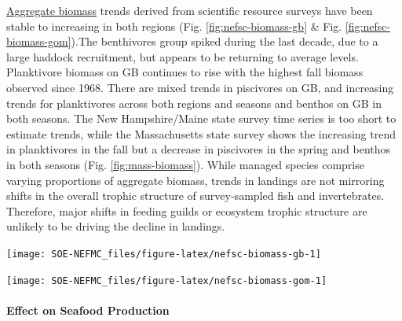 \documentclass[
  10pt,
]{article}
\let\origfigure\figure
\let\endorigfigure\endfigure
\renewenvironment{figure}[1][2] {
    \expandafter\origfigure\expandafter[H]
} {
    \endorigfigure
}
\begin{document}
\href{https://noaa-edab.github.io/catalog/aggregate_biomass.html}{Aggregate biomass} trends derived from scientific resource surveys have been stable to increasing in both regions (Fig. \ref{fig:nefsc-biomass-gb} \& Fig. \ref{fig:nefsc-biomass-gom}).The benthivores group spiked during the last decade, due to a large haddock recruitment, but appears to be returning to average levels. Planktivore biomass on GB continues to rise with the highest fall biomass observed since 1968. There are mixed trends in piscivores on GB, and increasing trends for planktivores across both regions and seasons and benthos on GB in both seasons. The New Hampshire/Maine state survey time series is too short to estimate trends, while the Massachusetts state survey shows the increasing trend in planktivores in the fall but a decrease in piscivores in the spring and benthos in both seasons (Fig. \ref{fig:mass-biomass}). While managed species comprise varying proportions of aggregate biomass, trends in landings are not mirroring shifts in the overall trophic structure of survey-sampled fish and invertebrates. Therefore, major shifts in feeding guilds or ecosystem trophic structure are unlikely to be driving the decline in landings.

\begin{figure}

{\centering \texttt{[image: SOE-NEFMC\_files/figure-latex/nefsc-biomass-gb-1]} 

}

\caption{Spring (left) and fall (right) surveyed biomass on Georges Bank. The shaded area around each annual mean represents 2 standard deviations from the mean.}\label{fig:nefsc-biomass-gb}
\end{figure}

\begin{figure}

{\centering \texttt{[image: SOE-NEFMC\_files/figure-latex/nefsc-biomass-gom-1]} 

}

\caption{Spring (left) and fall (right) surveyed biomass in the Gulf of Maine. The shaded area around each annual mean represents 2 standard deviations from the mean.}\label{fig:nefsc-biomass-gom}
\end{figure}

\hypertarget{effect-on-seafood-production}{%
\paragraph{Effect on Seafood Production}\label{effect-on-seafood-production}}
\end{document}

